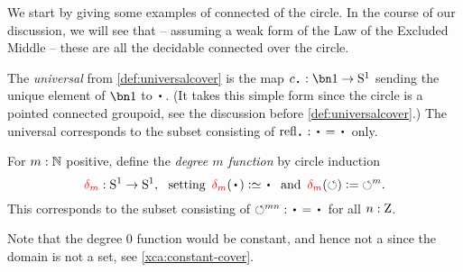 We start by giving some examples of connected \coverings of the circle.
In the course of our discussion, we will see that -- assuming a weak form
of the Law of the Excluded Middle -- these are all the decidable connected 
\coverings over the circle.

\begin{example}\label{exa:univS1cover}
The \emph{universal} \covering from \cref{def:universalcover}
is the map $c_\base:\bn 1\to \Sc$ 
sending the unique element of $\bn 1$ to $\base$. 
(It takes this simple form since the circle is a pointed connected
groupoid, see the discussion before \cref{def:universalcover}.)
The universal \covering corresponds to the subset consisting 
of $\refl\base : \base=\base$ only.  
\end{example}

\begin{example}\label{exa:mfoldS1cover}
For $m:\mathbb{N}$ positive, define the \emph{degree $m$ function} by circle induction
\[
\dg{m}:\Sc\to \Sc, \text{~~setting~} 
\dg{m}(\base)\defeq\base \text{~~and~} 
\dg{m}(\Sloop)\defis{\Sloop}^m.
\]
This \covering corresponds to the subset consisting 
of ${\Sloop}^{mn} : \base=\base$ for all $n:\mathrm{Z}$.
\end{example}

Note that the degree $0$ function would be constant,
and hence not a \covering since the domain is not a set,
see \cref{xca:constant-cover}.

